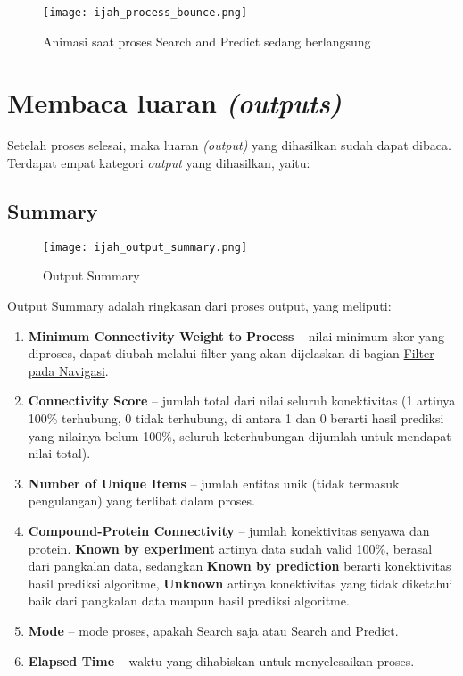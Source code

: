 \begin{figure}[H]
	\centering
	\texttt{[image: ijah\_process\_bounce.png]}
	\caption{Animasi saat proses Search and Predict sedang berlangsung}
	\label{fig:ijah_process_bounce}
	\end{figure}

\section{Membaca luaran \emph{(outputs)}}
Setelah proses selesai, maka luaran \emph{(output)} yang dihasilkan sudah dapat dibaca. Terdapat empat kategori \emph{output} yang dihasilkan, yaitu:
	
	\subsection{Summary} \label{summary}
	\begin{figure}[H]
	\centering
	\texttt{[image: ijah\_output\_summary.png]}
	\caption{Output Summary}
	\label{fig:ijah_output_summary}
	\end{figure}
	
	Output Summary adalah ringkasan dari proses output, yang meliputi:
	\begin{enumerate}
	\item \textbf{Minimum Connectivity Weight to Process} -- nilai minimum skor yang diproses, dapat diubah melalui filter yang akan dijelaskan di bagian \hyperref[nav]{Filter pada Navigasi}.
	\item \textbf{Connectivity Score} -- jumlah total dari nilai seluruh konektivitas (1 artinya 100\% terhubung, 0 tidak terhubung, di antara 1 dan 0 berarti hasil prediksi yang nilainya belum 100\%, seluruh keterhubungan dijumlah untuk mendapat nilai total).
	\item \textbf{Number of Unique Items} -- jumlah entitas unik (tidak termasuk pengulangan) yang terlibat dalam proses.
	\item \textbf{Compound-Protein Connectivity} -- jumlah konektivitas senyawa dan protein. \textbf{Known by experiment} artinya data sudah valid 100\%, berasal dari pangkalan data, sedangkan \textbf{Known by prediction} berarti konektivitas hasil prediksi algoritme, \textbf{Unknown} artinya konektivitas yang tidak diketahui baik dari pangkalan data maupun hasil prediksi algoritme.
	\item \textbf{Mode} -- mode proses, apakah Search saja atau Search and Predict.
	\item \textbf{Elapsed Time} -- waktu yang dihabiskan untuk menyelesaikan proses.
	\end{enumerate}
	
